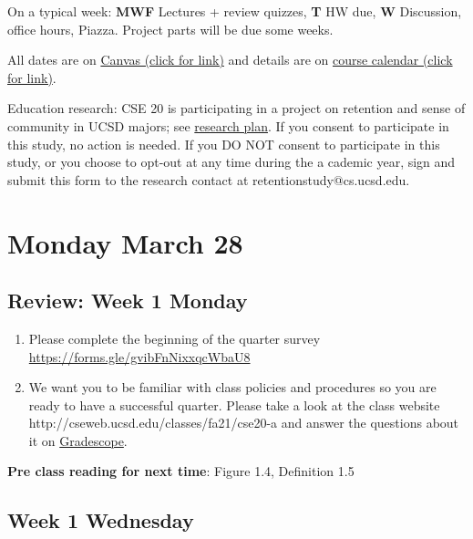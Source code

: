 On a typical week: {\bf MWF} Lectures + review quizzes, {\bf T} HW due, {\bf W} Discussion, office hours, Piazza. 
Project parts will be due some weeks.

All dates are on \href{https://canvas.ucsd.edu/}{Canvas (click for link)} and details are on
 \href{https://discrete-math-for-cs.github.io/website/overview_calendar.html}{course calendar (click for link)}.

Education research: CSE 20 is participating in a project on retention and sense of community 
in UCSD majors; see \href{https://discrete-math-for-cs.github.io/files/CSInclusiveMentoringConsentFormNonCSEDataAnalysis.pdf}{research plan}. If you consent to participate in this study, no action is needed. 
If you DO NOT consent to participate in this study, or you choose to opt-out at any time during the a
cademic year, sign and submit this form to the research contact at retentionstudy@cs.ucsd.edu.


\newpage
\section*{Monday March 28}


    
\newpage
\subsection*{Review: Week 1 Monday}
\begin{enumerate}
\item Please complete the beginning of the quarter survey \href{https://forms.gle/gvibFnNixxqcWbaU8}{https://forms.gle/gvibFnNixxqcWbaU8}
\item We want you to be familiar with class policies and procedures so you are ready to have a successful quarter. 
Please take a look at the class website http://cseweb.ucsd.edu/classes/fa21/cse20-a
and answer the questions about it on \href{http://gradescope.com}{Gradescope}.
\end{enumerate}

{\bf Pre class reading for next time}: Figure 1.4, Definition 1.5

\newpage
\subsection*{Week 1 Wednesday}

